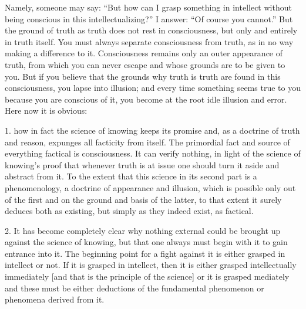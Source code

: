 Namely, someone may say:
“But how can I grasp something in intellect without
being conscious in this intellectualizing?”
I answer: “Of course you cannot.”
But the ground of truth as truth does not rest in consciousness,
but only and entirely in truth itself.
You must always separate consciousness from truth,
as in no way making a difference to it.
Consciousness remains only an outer appearance of truth,
from which you can never escape
and whose grounds are to be given to you.
But if you believe that the grounds why truth is truth
are found in this consciousness, you lapse into illusion;
and every time something seems true to you
because you are conscious of it,
you become at the root idle illusion and error.
Here now it is obvious:

1. how in fact the science of knowing keeps its promise
and, as a doctrine of truth and reason,
expunges all facticity from itself.
The primordial fact and source of
everything factical is consciousness.
It can verify nothing, in light of the science of knowing’s proof
that whenever truth is at issue
one should turn it aside and abstract from it.
To the extent that this science
in its second part is a phenomenology,
a doctrine of appearance and illusion,
which is possible only out of the first
and on the ground and basis of the latter,
to that extent it surely deduces both as existing,
but simply as they indeed exist, as factical.

2. It has become completely clear why nothing external
could be brought up against the science of knowing,
but that one always must begin with it to gain entrance into it.
The beginning point for a fight against it is
either grasped in intellect or not.
If it is grasped in intellect,
then it is either grasped intellectually immediately
[and that is the principle of the science]
or it is grasped mediately
and these must be either deductions of
the fundamental phenomenon or phenomena derived from it.

